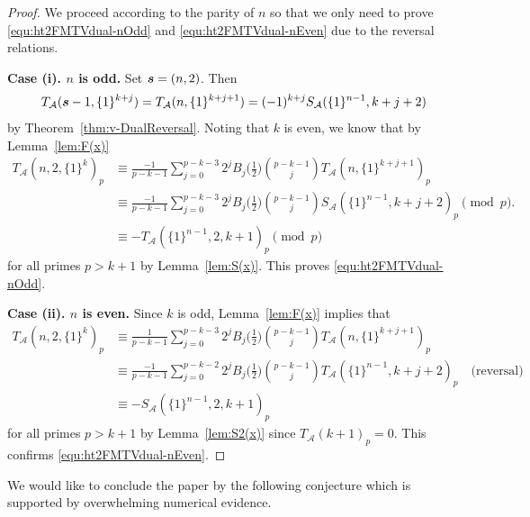 \documentclass{article}
\newcommand{\bfs}{{\boldsymbol{\sl{s}}}}
\newcommand{\calA}{\mathcal{A}}
\theoremstyle{plain}
\theoremstyle{definition}
\begin{document}
\begin{proof}
We proceed according to the parity of $n$ so that we only need to prove \eqref{equ:ht2FMTVdual-nOdd} and  \eqref{equ:ht2FMTVdual-nEven} due to the reversal relations.

\medskip
\noindent
\textbf{Case (i). $n$ is odd.} Set $\bfs=(n,2)$. Then
$$T_\calA(\bfs-1,\{1\}^{k+j})=T_\calA(n,\{1\}^{k+j+1})=(-1)^{k+j}S_\calA(\{1\}^{n-1},k+j+2)$$
by Theorem~\ref{thm:v-DualReversal}. Noting that $k$ is even, we know that by Lemma~\ref{lem:F(x)}
\begin{align*}
T_\calA(n,2,\{1\}^{k})_p&\equiv\frac{-1}{p-k-1}\sum_{j=0}^{p-k-3}2^jB_j\Big(\frac12\Big) \binom{p-k-1}{j} T_\calA(n,\{1\}^{k+j+1})_p\\
&\equiv\frac{-1}{p-k-1}\sum_{j=0}^{p-k-3}2^jB_j\Big(\frac12\Big) \binom{p-k-1}{j}S_\calA(\{1\}^{n-1},k+j+2)_p   \pmod{p}.\\
&\equiv -T_\calA(\{1\}^{n-1},2,k+1)_p   \pmod{p}
\end{align*}
for all primes $p>k+1$ by Lemma~\ref{lem:S(x)}. This proves \eqref{equ:ht2FMTVdual-nOdd}.

\medskip
\noindent
\textbf{Case (ii). $n$ is even.} Since $k$ is odd, Lemma~\ref{lem:F(x)} implies that
\begin{align*}
T_\calA(n,2,\{1\}^{k})_p&\equiv\frac{1}{p-k-1}\sum_{j=0}^{p-k-3}2^jB_j\Big(\frac12\Big)\binom{p-k-1}{j}T_\calA(n,\{1\}^{k+j+1})_p\\
&\equiv\frac{-1}{p-k-1} \sum_{j=0}^{p-k-2}2^jB_{j}\Big(\frac12\Big)\binom{p-k-1}{j}T_\calA(\{1\}^{n-1},k+j+2)_p  \quad\text{(reversal)}\\
&\equiv - S_\calA(\{1\}^{n-1},2,k+1)_p
\end{align*}
for all primes $p>k+1$ by Lemma~\ref{lem:S2(x)} since $T_\calA(k+1)_p=0$. This confirms \eqref{equ:ht2FMTVdual-nEven}.
\end{proof}

We would like to conclude the paper by the following conjecture which is supported by overwhelming numerical evidence.
\end{document}

